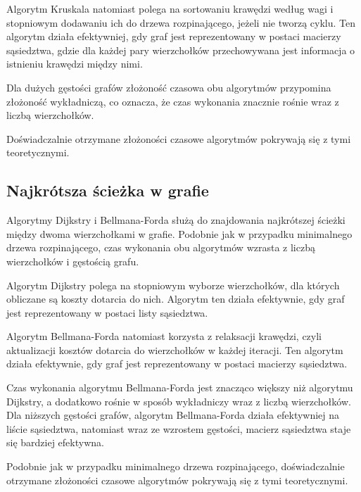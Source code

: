 \documentclass{article}
\begin{document}
        Algorytm Kruskala natomiast polega na sortowaniu krawędzi według wagi i stopniowym dodawaniu ich do drzewa rozpinającego, jeżeli nie tworzą cyklu. 
        Ten algorytm działa efektywniej, gdy graf jest reprezentowany w postaci macierzy sąsiedztwa, 
        gdzie dla każdej pary wierzchołków przechowywana jest informacja o istnieniu krawędzi między nimi.

        Dla dużych gęstości grafów złożoność czasowa obu algorytmów przypomina złożoność wykładniczą, 
        co oznacza, że czas wykonania znacznie rośnie wraz z liczbą wierzchołków.

        Doświadczalnie otrzymane złożoności czasowe algorytmów pokrywają się z tymi teoretycznymi.

    \subsection{Najkrótsza ścieżka w grafie}

        Algorytmy Dijkstry i Bellmana-Forda służą do znajdowania najkrótszej ścieżki między dwoma wierzchołkami w grafie. 
        Podobnie jak w przypadku minimalnego drzewa rozpinającego, czas wykonania obu algorytmów wzrasta z liczbą wierzchołków i gęstością grafu.

        Algorytm Dijkstry polega na stopniowym wyborze wierzchołków, dla których obliczane są koszty dotarcia do nich. 
        Algorytm ten działa efektywnie, gdy graf jest reprezentowany w postaci listy sąsiedztwa.

        Algorytm Bellmana-Forda natomiast korzysta z relaksacji krawędzi, czyli aktualizacji kosztów dotarcia do wierzchołków w każdej iteracji. 
        Ten algorytm działa efektywnie, gdy graf jest reprezentowany w postaci macierzy sąsiedztwa.

        Czas wykonania algorytmu Bellmana-Forda jest znacząco większy niż algorytmu Dijkstry, a dodatkowo rośnie w sposób wykładniczy wraz z liczbą wierzchołków. 
        Dla niższych gęstości grafów, algorytm Bellmana-Forda działa efektywniej na liście sąsiedztwa, natomiast wraz ze wzrostem gęstości, 
        macierz sąsiedztwa staje się bardziej efektywna.

        Podobnie jak w przypadku minimalnego drzewa rozpinającego, doświadczalnie otrzymane złożoności czasowe algorytmów pokrywają się z tymi teoretycznymi.
\end{document}
